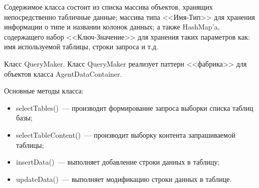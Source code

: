 Содержимое класса состоит из списка массива объектов, хранящих непосредственно табличные данные; массива типа <<Имя-Тип>> для хранения информации о типе и названии колонок данных; а также HashMap'a, содержащего набор <<Ключ-Значение>> для хранения таких параметров как: имя используемой таблицы, строки запроса и т.д.

Класс QueryMaker. Класс QueryMaker реализует паттерн <<фабрика>> для объектов класса AgentDataContainer.

Основные методы класса:
\begin{itemize}
\item selectTables()~--- производит формирование запроса выборки списка таблиц базы;
\item selectTableContent()~--- производит выборку контента запрашиваемой таблицы;
\item insertData()~--- выполняет добавление строки данных в таблицу;
\item updateData()~--- выполняет модификацию строки данных в таблице.
\end{itemize}

